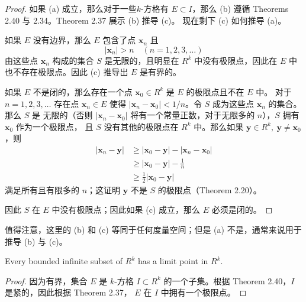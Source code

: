 \documentclass[../poma-notes.tex]{subfiles}
\begin{document}
\begin{proof}
  如果 (a) 成立，那么对于一些$k$-方格有 $E \subset I$，那么 (b) 遵循 Theorems 2.40 与 2.34。Theorem 2.37 展示 (b) 推导 (c)。
  现在剩下 (c) 如何推导 (a)。

  如果 $E$ 没有边界，那么 $E$ 包含了点 $\mathbf{x}_n$ 且
  \[|\mathbf{x}_n| > n \quad (n=1,2,3,\dots)\]
  由这些点 $\mathbf{x}_n$ 构成的集合 $S$ 是无限的，且明显在 $R^k$ 中没有极限点，因此在 $E$ 中也不存在极限点。因此 (c) 推导出
  $E$ 是有界的。

  如果 $E$ 不是闭的，那么存在一个点 $\mathbf{x}_0 \in R^k$ 是 $E$ 的极限点且不在 $E$ 中。 对于 $n=1,2,3,\dots$ 存在点
  $\mathbf{x}_n \in E$ 使得 $|\mathbf{x}_n - \mathbf{x}_0| < 1/n$。令 $S$ 成为这些点 $\mathbf{x}_n$ 的集合。那么 $S$ 是
  无限的（否则 $|\mathbf{x}_n - \mathbf{x}_0|$ 将有一个常量正数，对于无限多的 $n$），$S$ 拥有 $\mathbf{x}_0$ 作为一个极限点，
  且 $S$ 没有其他的极限点在 $R^k$ 中。那么如果 $\mathbf{y} \in R^k, \ \mathbf{y} \ne \mathbf{x}_0$，则
  \begin{align*}
    \mathcal{} |\mathbf{x}_n - \mathbf{y}| & \ge |\mathbf{x}_0 - \mathbf{y}| - |\mathbf{x}_n - \mathbf{x}_0| \\
                                           & \ge |\mathbf{x}_0 - \mathbf{y}| - \frac{1}{n}                   \\
                                           & \ge \frac{1}{2}|\mathbf{x}_0 - \mathbf{y}|
  \end{align*}
  满足所有且有限多的 $n$；这证明 $\mathbf{y}$ 不是 $S$ 的极限点（Theorem 2.20）。

  因此 $S$ 在 $E$ 中没有极限点；因此如果 (c) 成立，那么 $E$ 必须是闭的。
\end{proof}

值得注意，这里的 (b) 和 (c) 等同于任何度量空间；但是 (a) 不是，通常来说用于推导 (b) 与 (c)。

\begin{theorem}[Weierstrass]
  Every bounded infinite subset of $R^k$ has a limit point in $R^k$.
\end{theorem}

\begin{proof}
  因为有界，集合 $E$ 是 $k$-方格 $I \subset R^k$ 的一个子集。根据 Theorem 2.40，$I$ 是紧的，因此根据 Theorem 2.37， $E$ 在
  $I$ 中拥有一个极限点。
\end{proof}
\end{document}
